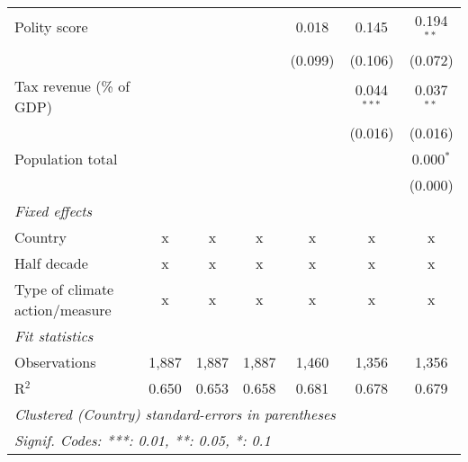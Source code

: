 \begin{tabular}{lcccccc}
   Polity score                                                          &         &               &                & 0.018          & 0.145          & 0.194$^{**}$\\   
                                                                         &         &               &                & (0.099)        & (0.106)        & (0.072)\\   
   Tax revenue (\% of GDP)                                               &         &               &                &                & 0.044$^{***}$  & 0.037$^{**}$\\   
                                                                         &         &               &                &                & (0.016)        & (0.016)\\   
   Population total                                                      &         &               &                &                &                & 0.000$^{*}$\\   
                                                                         &         &               &                &                &                & (0.000)\\   
   \emph{Fixed effects}\\
   Country                                                               & x       & x             & x              & x              & x              & x\\  
   Half decade                                                           & x       & x             & x              & x              & x              & x\\  
   Type of climate action/measure                                        & x       & x             & x              & x              & x              & x\\  
   \midrule \emph{Fit statistics}\\
   Observations                                                          & 1,887   & 1,887         & 1,887          & 1,460          & 1,356          & 1,356\\  
   R$^2$                                                                 & 0.650   & 0.653         & 0.658          & 0.681          & 0.678          & 0.679\\  
   \midrule
   \multicolumn{7}{l}{\emph{Clustered (Country) standard-errors in parentheses}}\\
   \multicolumn{7}{l}{\emph{Signif. Codes: ***: 0.01, **: 0.05, *: 0.1}}\\
\end{tabular}
\par\endgroup


